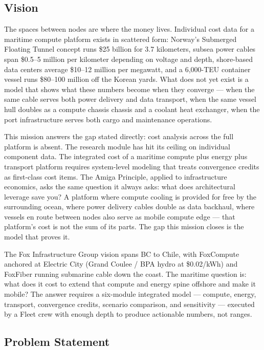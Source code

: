 \documentclass[11pt,letterpaper]{article}
\begin{document}
\subsection{Vision}

The spaces between nodes are where the money lives. Individual cost data for a maritime compute platform
exists in scattered form: Norway's Submerged Floating Tunnel concept runs \$25 billion for 3.7
kilometers, subsea power cables span \$0.5--5 million per kilometer depending on voltage and depth,
shore-based data centers average \$10--12 million per megawatt, and a 6,000-TEU container vessel
runs \$80--100 million off the Korean yards. What does not yet exist is a model that shows what
these numbers become when they converge --- when the same cable serves both power delivery and
data transport, when the same vessel hull doubles as a compute chassis chassis and a coolant heat
exchanger, when the port infrastructure serves both cargo and maintenance operations.

This mission answers the gap stated directly: cost analysis across the full platform is absent.
The research module has hit its ceiling on individual component data. The integrated cost of a
maritime compute plus energy plus transport platform requires system-level modeling that treats
convergence credits as first-class cost items. The Amiga Principle, applied to infrastructure
economics, asks the same question it always asks: what does architectural leverage save you?
A platform where compute cooling is provided for free by the surrounding ocean, where power
delivery cables double as data backhaul, where vessels en route between nodes also serve as
mobile compute edge --- that platform's cost is not the sum of its parts. The gap this mission
closes is the model that proves it.

The Fox Infrastructure Group vision spans BC to Chile, with FoxCompute anchored at Electric City
(Grand Coulee / BPA hydro at \$0.02/kWh) and FoxFiber running submarine cable down the coast.
The maritime question is: what does it cost to extend that compute and energy spine offshore and
make it mobile? The answer requires a six-module integrated model --- compute, energy, transport,
convergence credits, scenario comparison, and sensitivity --- executed by a Fleet crew with enough
depth to produce actionable numbers, not ranges.

\subsection{Problem Statement}
\end{document}
